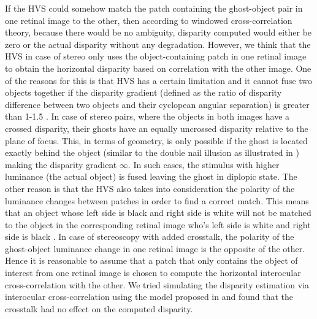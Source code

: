 If the HVS could somehow match the patch containing the ghost-object pair in one retinal image to the other, then according to windowed cross-correlation theory, because there would be no ambiguity, disparity computed would either be zero or the actual disparity without any degradation. However, we think that the HVS in case of stereo only uses the object-containing patch in one retinal image to obtain the horizontal disparity based on correlation with the other image. One of the reasons for this is that HVS has a certain limitation and it cannot fuse two objects together if the disparity gradient (defined as the ratio of disparity difference between two objects and their cyclopean angular separation) is greater than 1-1.5 \cite{howard1995binocular} \cite{kane2014limits}. In case of stereo pairs, where the objects in both images have a crossed disparity, their ghosts have an equally uncrossed disparity relative to the plane of focus. This, in terms of geometry, is only possible if the ghost is located exactly behind the object (similar to the double nail illusion as illustrated in \cite{tsirlin2012effect} \cite{krol1980double}) making the disparity gradient $\infty$. In such cases, the stimulus with higher luminance (the actual object) is fused leaving the ghost in diplopic state. The other reason is that the HVS also takes into consideration the polarity of the luminance changes between patches in order to find a correct match. This means that an object whose left side is black and right side is white will not be matched to the object in the corresponding retinal image who's left side is white and right side is black \cite{howard1995binocular}. In case of stereoscopy with added crosstalk, the polarity of the ghost-object luminance change in one retinal image is the opposite of the other. Hence it is reasonable to assume that a patch that only contains the object of interest from one retinal image is chosen to compute the horizontal interocular cross-correlation with the other. We tried simulating the disparity estimation via interocular cross-correlation using the model proposed in \cite{filippini2009limits} and found that the crosstalk had no effect on the computed disparity.

